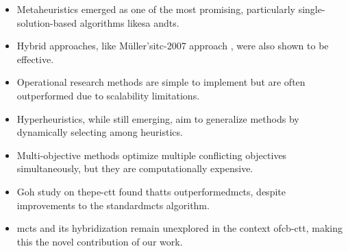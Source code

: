 \begin{itemize}
\item Metaheuristics emerged as one of the most promising, particularly single-solution-based algorithms like\ac{sa} and\ac{ts}.
\item Hybrid approaches, like Müller’s\ac{itc-2007} approach \cite{muller_itc2007}, were also shown to be effective.
\item Operational research methods are simple to implement but are often outperformed due to scalability limitations.
\item Hyperheuristics, while still emerging, aim to generalize methods by dynamically selecting among heuristics.
\item Multi-objective methods optimize multiple conflicting objectives simultaneously, but they are computationally expensive.
\item Goh \cite{goh_MCTS} study on the\ac{pe-ctt} found that\ac{ts} outperformed\ac{mcts}, despite improvements to the standard\ac{mcts} algorithm.
\item\ac{mcts} and its hybridization remain unexplored in the context of\ac{cb-ctt}, making this the novel contribution of our work.
\end{itemize}






















